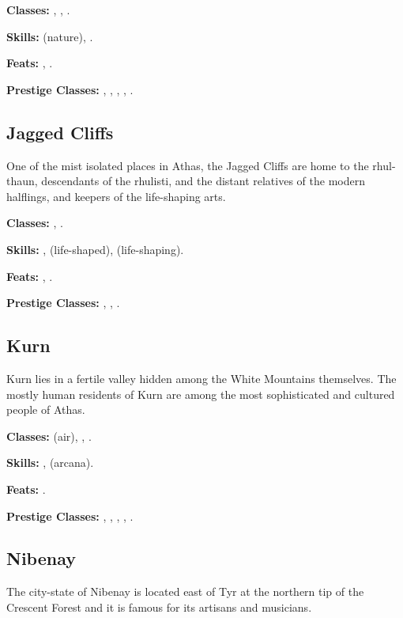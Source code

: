 \textbf{Classes:} , , .

\textbf{Skills:}  (nature), .

\textbf{Feats:} , .

\textbf{Prestige Classes:} , , , , .


\subsection{Jagged Cliffs}
One of the mist isolated places in Athas, the Jagged Cliffs are home to the rhul-thaun, descendants of the rhulisti, and the distant relatives of the modern halflings, and keepers of the life-shaping arts.

\textbf{Classes:} , .

\textbf{Skills:} ,  (life-shaped),  (life-shaping).

\textbf{Feats:} , .

\textbf{Prestige Classes:} , , .


\subsection{Kurn}
Kurn lies in a fertile valley hidden among the White Mountains themselves. The mostly human residents of Kurn are among the most sophisticated and cultured people of Athas.

\textbf{Classes:}  (air), , .

\textbf{Skills:} ,  (arcana).

\textbf{Feats:} .

\textbf{Prestige Classes:} , , , , .

\subsection{Nibenay}
The city-state of Nibenay is located east of Tyr at the northern tip of the Crescent Forest and it is famous for its artisans and musicians.

